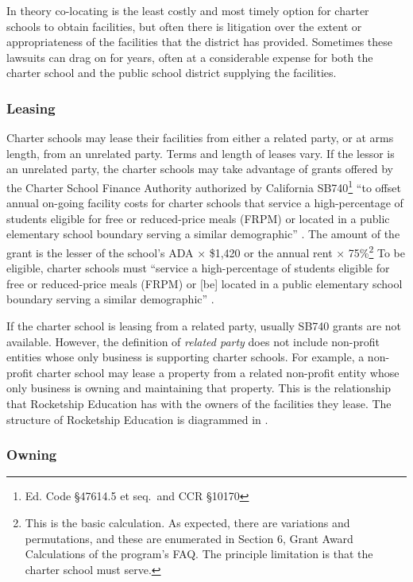In theory co-locating is the least costly and most timely option for charter schools to obtain facilities, but often there is litigation over the extent or appropriateness of the facilities that the district has provided. Sometimes these lawsuits can drag on for years, often at a considerable expense for both the charter school and the public school district supplying the facilities.

\subsubsection{Leasing}\label{sec:leasing}\indent

Charter schools may lease their facilities from either a related party, or at arms length, from an unrelated party. Terms and length of leases vary. If the lessor is an unrelated party, the charter schools may take advantage of grants offered by the Charter School Finance Authority authorized by California SB740\footnote{Ed. Code §47614.5 et seq. and CCR §10170 } ``to offset annual on-going facility costs for charter schools that service a high-percentage of students eligible for free or reduced-price meals (FRPM) or located in a public elementary school boundary serving a similar demographic'' \parencite{CATreasurer2023}. The amount of the grant is the lesser of the school's ADA × \$1,420 or the annual rent × 75\%\footnote{This is the basic calculation. As expected, there are variations and permutations, and these are enumerated in Section 6, Grant Award Calculations of the program's FAQ\@. The principle limitation is that the charter school must serve.} To be eligible, charter schools must ``service a high-percentage of students eligible for free or reduced-price meals (FRPM) or [be] located in a public elementary school boundary serving a similar demographic'' \parencite{CATreasurer2023}.

If the charter school is leasing from a related party, usually SB740 grants are not available. However, the definition of \emph{related party} does not include non-profit entities whose only business is supporting charter schools. For example, a non-profit charter school may lease a property from a related non-profit entity whose only business is owning and maintaining that property. This is the relationship that Rocketship Education has with the owners of the facilities they lease. The structure of Rocketship Education is diagrammed in .

\subsubsection{Owning}\label{sec:owning}\indent

